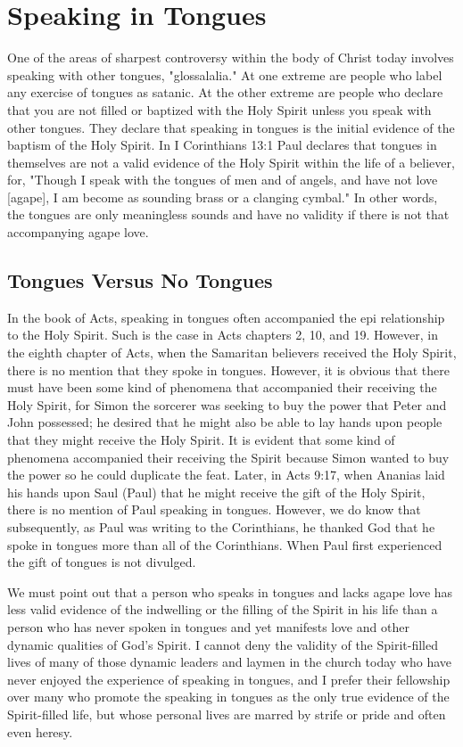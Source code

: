 \chapter{Speaking in Tongues}

One of the areas of sharpest controversy within the body of Christ today involves speaking with other tongues, "glossalalia." At one extreme are people who label any exercise of tongues as satanic. At the other extreme are people who declare that you are not filled or baptized with the Holy Spirit unless you speak with other tongues. They declare that speaking in tongues is the initial evidence of the baptism of the Holy Spirit. In I Corinthians 13:1 Paul declares that tongues in themselves are not a valid evidence of the Holy Spirit within the life of a believer, for, "Though I speak with the tongues of men and of angels, and have not love [agape], I am become as sounding brass or a clanging cymbal." In other words, the tongues are only meaningless sounds and have no validity if there is not that accompanying agape love. 

\section*{Tongues Versus No Tongues}

In the book of Acts, speaking in tongues often accompanied the epi relationship to the Holy Spirit. Such is the case in Acts chapters 2, 10, and 19. However, in the eighth chapter of Acts, when the Samaritan believers received the Holy Spirit, there is no mention that they spoke in tongues. However, it is obvious that there must have been some kind of phenomena that accompanied their receiving the Holy Spirit, for Simon the sorcerer was seeking to buy the power that Peter and John possessed; he desired that he might also be able to lay hands upon people that they might receive the Holy Spirit. It is evident that some kind of phenomena accompanied their receiving the Spirit because Simon wanted to buy the power so he could duplicate the feat. Later, in Acts 9:17, when Ananias laid his hands upon Saul (Paul) that he might receive the gift of the Holy Spirit, there is no mention of Paul speaking in tongues. However, we do know that subsequently, as Paul was writing to the Corinthians, he thanked God that he spoke in tongues more than all of the Corinthians. When Paul first experienced the gift of tongues is not divulged. 

We must point out that a person who speaks in tongues and lacks agape love has less valid evidence of the indwelling or the filling of the Spirit in his life than a person who has never spoken in tongues and yet manifests love and other dynamic qualities of God's Spirit. I cannot deny the validity of the Spirit-filled lives of many of those dynamic leaders and laymen in the church today who have never enjoyed the experience of speaking in tongues, and I prefer their fellowship over many who promote the speaking in tongues as the only true evidence of the Spirit-filled life, but whose personal lives are marred by strife or pride and often even heresy. 

